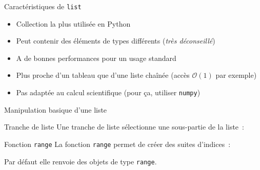 \begin{frame}{Caractéristiques de \texttt{list}}
  \begin{itemize}[<+->]
    \item Collection la plus utilisée en Python
    \item Peut contenir des éléments de types différents (\emph{très déconseillé})
    \item A de bonnes performances pour un usage standard
    \item Plus proche d'un tableau que d'une liste chaînée (accès $\mathcal{O}(1)$ par exemple)
    \item Pas adaptée au calcul scientifique (pour ça, utiliser \texttt{numpy})
  \end{itemize}
\end{frame}

\begin{frame}{Manipulation basique d'une liste}
\end{frame}

\begin{frame}{Tranche de liste}
  Une tranche de liste sélectionne une sous-partie de la liste~:
\end{frame}

\begin{frame}{Fonction \texttt{range}}
  La fonction \texttt{range} permet de créer des suites d'indices~:


  Par défaut elle renvoie des objets de type \texttt{range}.
\end{frame}
